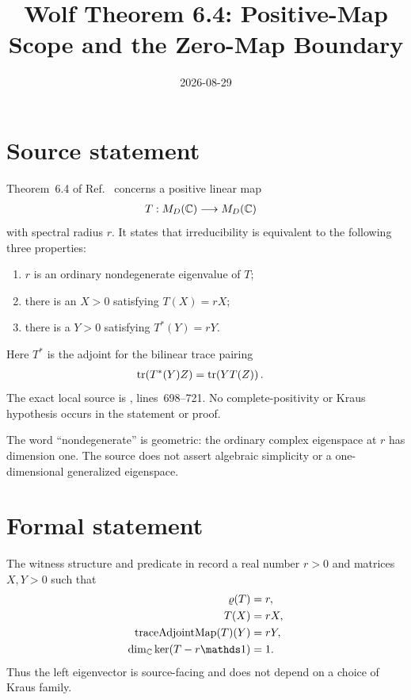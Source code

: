 \documentclass[11pt]{article}
\title{Wolf Theorem 6.4: Positive-Map Scope and the Zero-Map Boundary}
\author{}
\date{2026-08-29}
\begin{document}
\maketitle
{}

\section{Source statement}

Theorem~6.4 of Ref.~\cite{Wolf2012Quantum} concerns a positive linear map
\begin{align}
  T
    &: M_{D}(\mathbb{C})\longrightarrow M_{D}(\mathbb{C})
  \label{eq:wolf_thm6_4_positive_map_spectral_characterization_map}
\end{align}
with spectral radius $r$.  It states that irreducibility is equivalent to the
following three properties:
\begin{enumerate}
  \item $r$ is an ordinary nondegenerate eigenvalue of $T$;
  \item there is an $X>0$ satisfying $T(X)=rX$;
  \item there is a $Y>0$ satisfying $T^*(Y)=rY$.
\end{enumerate}
Here $T^*$ is the adjoint for the bilinear trace pairing
\begin{align}
  \operatorname{tr}\!\left(T^*(Y)Z\right)
    &=\operatorname{tr}\!\left(YT(Z)\right).
  \label{eq:wolf_thm6_4_positive_map_spectral_characterization_trace_pairing}
\end{align}
The exact local source is
, lines~698--721.
No complete-positivity or Kraus hypothesis occurs in the statement or proof.

The word ``nondegenerate'' is geometric: the ordinary complex eigenspace at
$r$ has dimension one.  The source does not assert algebraic simplicity or a
one-dimensional generalized eigenspace.

\section{Formal statement}

The witness structure  and predicate
 in
record a real number $r>0$
and matrices $X,Y>0$ such that
\begin{align}
  \varrho(T)
    &=r,
  \label{eq:wolf_thm6_4_positive_map_spectral_characterization_radius}\\
  T(X)
    &=rX,
  \label{eq:wolf_thm6_4_positive_map_spectral_characterization_right}\\
  \operatorname{traceAdjointMap}(T)(Y)
    &=rY,
  \label{eq:wolf_thm6_4_positive_map_spectral_characterization_left}\\
  \dim_{\mathbb C}\ker(T-r\Id)
    &=1.
  \label{eq:wolf_thm6_4_positive_map_spectral_characterization_simple}
\end{align}
Thus the left eigenvector is source-facing and does not depend on a choice of
Kraus family.
\end{document}
